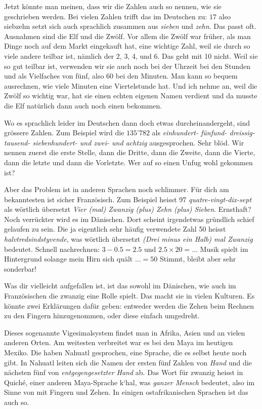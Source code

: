 Jetzt könnte man meinen, dass wir die Zahlen auch so nennen, wie sie geschrieben werden. Bei vielen Zahlen trifft das im Deutschen zu: $17$ also siebzehn setzt sich auch sprachlich zusammen aus \textit{sieben} und \textit{zehn}. Das passt oft. Ausnahmen sind die Elf und die Zwölf. Vor allem die Zwölf war früher, als man Dinge noch auf dem Markt eingekauft hat, eine wichtige Zahl, weil sie durch so viele andere teilbar ist, nämlich der 2, 3, 4, und 6. Das geht mit 10 nicht. Weil sie so gut teilbar ist, verwenden wir sie auch noch bei der Uhrzeit bei den Stunden und als Vielfaches von fünf, also 60 bei den Minuten. Man kann so bequem ausrechnen, wie viele Minuten eine Viertelstunde hat. Und ich nehme an, weil die Zwölf so wichtig war, hat sie einen echten eigenen Namen verdient und da musste die Elf natürlich dann auch noch einen bekommen.

Wo es sprachlich leider im Deutschen dann doch etwas durcheinandergeht, sind grössere Zahlen. Zum Beispiel wird die $135’782$ als \textit{einhundert- fünfund- dreissig- tausend- siebenhundert- und zwei- und achtzig} ausgesprochen. Sehr blöd. Wir nennen zuerst die erste Stelle, dann die Dritte, dann die Zweite, dann die Vierte, dann die letzte und dann die Vorletzte. Wer auf so einen Unfug wohl gekommen ist?

Aber das Problem ist in anderen Sprachen noch schlimmer. Für dich am bekanntesten ist sicher Französisch. Zum Beispiel heisst 97 \textit{quatre-vingt-dix-sept} als wörtlich übersetzt \textit{Vier (mal) Zwanzig (plus) Zehn (plus) Sieben}. Ernsthaft? Noch verrückter wird es im Dänischen. Dort scheint irgendetwas gründlich schief gelaufen zu sein. Die ja eigentlich sehr häufig verwendete Zahl 50 heisst \textit{halvtredsindstyvende}, was wörtlich übersetzt \textit{(Drei minus ein Halb) mal Zwanzig} bedeutet. Schnell nachrechnen: $3-0.5 = 2.5$ und $2.5\times20=\dots$ Musik spielt im Hintergrund solange mein Hirn sich quält $\dots = 50$ Stimmt, bleibt aber sehr sonderbar! 

Was dir vielleicht aufgefallen ist, ist das sowohl im Dänischen, wie auch im Französischen die zwanzig eine Rolle spielt. Das macht sie in vielen Kulturen. Es könnte zwei Erklärungen dafür geben: entweder werden die Zehen beim Rechnen zu den Fingern hinzugenommen, oder diese einfach umgedreht. 

Dieses sogenannte Vigesimalsystem findet man in Afrika, Asien und an vielen anderen Orten. Am weitesten verbreitet war es bei den Maya im heutigen Mexiko. Die haben Nahuatl gesprochen, eine Sprache, die es selbst heute noch gibt. In Nahuatl leiten sich die Namen der ersten fünf Zahlen von \textit{Hand} und die nächsten fünf von \textit{entgegengesetzter Hand} ab. Das Wort für zwanzig heisst in Quiché, einer anderen Maya-Sprache k‘hal, was \textit{ganzer Mensch} bedeutet, also im Sinne von mit Fingern und Zehen. In einigen ostafrikanischen Sprachen ist das auch so. 

